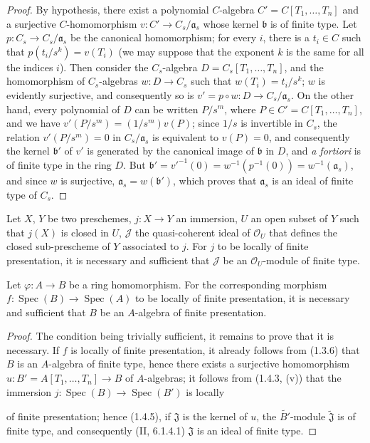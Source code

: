 \begin{proof}
By hypothesis, there exist a polynomial $C$-algebra
$C'=C[T_1,\ldots,T_n]$ and a surjective $C$-homomorphism
$v:C'\to C_s/\mathfrak a_s$ whose kernel $\mathfrak b$ is of finite type.
Let $p:C_s\to C_s/\mathfrak a_s$ be the canonical homomorphism; for every $i$,
there is a $t_i\in C$ such that $p(t_i/s^k)=v(T_i)$ (we may suppose that
the exponent $k$ is the same for all the indices $i$). Then consider the
$C_s$-algebra $D=C_s[T_1,\ldots,T_n]$, and the homomorphism of $C_s$-algebras
$w:D\to C_s$ such that $w(T_i)=t_i/s^k$; $w$ is evidently surjective, and
consequently so is $v'=p\circ w:D\to C_s/\mathfrak a_s$. On the other
hand, every polynomial of $D$ can be written $P/s^m$, where
$P\in C'=C[T_1,\ldots,T_n]$, and we have
$v'(P/s^m)=(1/s^m)v(P)$; since $1/s$ is invertible in $C_s$, the relation
$v'(P/s^m)=0$ in $C_s/\mathfrak a_s$ is equivalent to $v(P)=0$, and
consequently the kernel $\mathfrak b'$ of $v'$ is generated by the canonical
image of $\mathfrak b$ in $D$, and \emph{a fortiori} is of finite type in the
ring $D$. But
$\mathfrak b'=v'^{-1}(0)=w^{-1}(p^{-1}(0))=w^{-1}(\mathfrak a_s)$, and since
$w$ is surjective, $\mathfrak a_s=w(\mathfrak b')$, which proves that
$\mathfrak a_s$ is an ideal of finite type of $C_s$.
\end{proof}

\begin{corollary}[1.4.5]
\label{IV.1.4.5}
Let $X$, $Y$ be two preschemes, $j:X\to Y$ an immersion, $U$ an open subset
of $Y$ such that $j(X)$ is closed in $U$, $\mathcal J$ the quasi-coherent
ideal of $\mathcal O_U$ that defines the closed sub-prescheme of $Y$
associated to $j$. For $j$ to be locally of finite presentation, it is
necessary and sufficient that $\mathcal J$ be an $\mathcal O_U$-module of
finite type.
\end{corollary}

\par\medskip\noindent
\begin{proposition}[1.4.6]
\label{IV.1.4.6}
Let $\varphi:A\to B$ be a ring homomorphism. For the corresponding
morphism $f:\operatorname{Spec}(B)\to\operatorname{Spec}(A)$ to be locally of finite presentation,
it is necessary and sufficient that $B$ be an $A$-algebra of finite
presentation.
\end{proposition}

\begin{proof}
The condition being trivially sufficient, it remains to prove that it is
necessary. If $f$ is locally of finite presentation, it already follows from
(1.3.6) that $B$ is an $A$-algebra of finite type, hence there exists a
surjective homomorphism $u:B'=A[T_1,\ldots,T_n]\to B$ of $A$-algebras; it
follows from (1.4.3, (v)) that the immersion
$j:\operatorname{Spec}(B)\to\operatorname{Spec}(B')$ is locally


of finite presentation; hence (1.4.5), if $\mathfrak J$ is the kernel of $u$,
the $\widetilde{B'}$-module $\widetilde{\mathfrak J}$ is of finite type, and
consequently (II, 6.1.4.1) $\mathfrak J$ is an ideal of finite type.
\end{proof}

